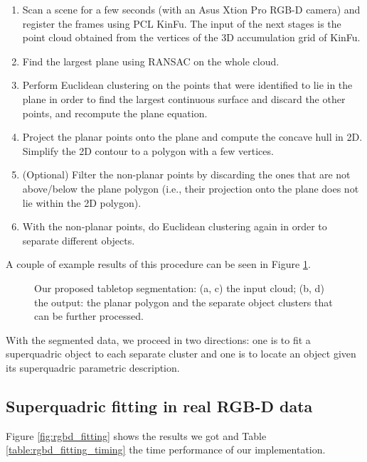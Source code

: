 \documentclass{article}
\begin{document}
\begin{enumerate}
\item {Scan a scene for a few seconds (with an Asus Xtion Pro RGB-D camera) and register the frames using PCL KinFu. The input of the next stages is the point cloud obtained from the vertices of the 3D accumulation grid of KinFu.}
\item {Find the largest plane using RANSAC on the whole cloud.}
\item {Perform Euclidean clustering on the points that were identified to lie in the plane in order to find the largest continuous surface and discard the other points, and recompute the plane equation.}
\item {Project the planar points onto the plane and compute the concave hull in 2D. Simplify the 2D contour to a polygon with a few vertices.}
\item {(Optional) Filter the non-planar points by discarding the ones that are not above/below the plane polygon (i.e., their projection onto the plane does not lie within the 2D polygon).}
\item {With the non-planar points, do Euclidean clustering again in order to separate different objects.}
\end{enumerate}

A couple of example results of this procedure can be seen in Figure \ref{fig:tabletop_segmentation}.

\begin{figure}
\centering

\caption{Our proposed tabletop segmentation: (a, c) the input cloud; (b, d) the output: the planar polygon and the separate object clusters that can be further processed.}
\label{fig:tabletop_segmentation}
\end{figure}

With the segmented data, we proceed in two directions: one is to fit a superquadric object to each separate cluster and one is to locate an object given its superquadric parametric description.

\subsection*{Superquadric fitting in real RGB-D data}
Figure \ref{fig:rgbd_fitting} shows the results we got and Table \ref{table:rgbd_fitting_timing} the time performance of our implementation.
\end{document}
